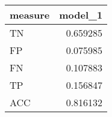 \begin{tabular}{lr}
\toprule
measure &  model\_1 \\
\midrule
     TN & 0.659285 \\
     FP & 0.075985 \\
     FN & 0.107883 \\
     TP & 0.156847 \\
    ACC & 0.816132 \\
\bottomrule
\end{tabular}
